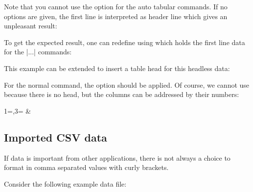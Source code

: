 \documentclass[a4paper,11pt]{ltxdoc}
\begin{document}

Note that you cannot use the  option for the auto tabular
commands. If no options are given, the first line is interpreted as header line
which gives an unpleasant result:

\begin{dispExample}
\end{dispExample}

To get the expected result, one can redefine 
using  which holds the first line data for the
|\csvauto...| commands:

\begin{dispExample}
\end{dispExample}

This example can be extended to insert a table head for this headless data:

\begin{dispExample}
\end{dispExample}

\clearpage

For the normal  command, the  option
should be applied. Of course, we cannot use 
because there is no head, but the columns can be addressed by their numbers:

\begin{dispExample}
  {1=\land,3=\amount}
  {\land & \amount}
\end{dispExample}


\clearpage
\subsection{Imported CSV data}\label{importeddata}%
If data is important from other applications, there is not always a choice
to format in comma separated values with curly brackets.

Consider the following example data file:
\end{document}
